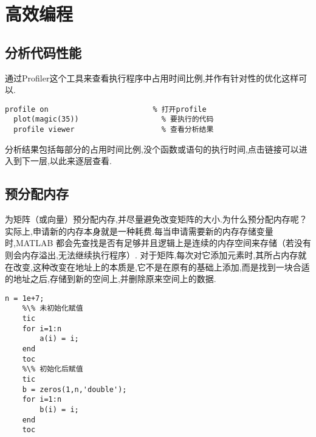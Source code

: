 \section{高效编程}



\subsection{分析代码性能}
 通过Profiler这个工具来查看执行程序中占用时间比例,并作有针对性的优化这样可以.

  \vspace{-0.8cm}
  \begin{lstlisting}[caption = 用Profiler分析代码性能] 
  profile on                        % 打开profile
  plot(magic(35))                   % 要执行的代码
  profile viewer                    % 查看分析结果
  \end{lstlisting}

分析结果包括每部分的占用时间比例,没个函数或语句的执行时间,点击链接可以进入到下一层,以此来逐层查看.





\subsection{预分配内存}
 为矩阵（或向量）预分配内存,并尽量避免改变矩阵的大小.为什么预分配内存呢？实际上,申请新的内存本身就是一种耗费.每当申请需要新的内存存储变量时,MATLAB 都会先查找是否有足够并且逻辑上是连续的内存空间来存储（若没有则会内存溢出,无法继续执行程序）. 对于矩阵,每次对它添加元素时,其所占内存就在改变,这种改变在地址上的本质是,它不是在原有的基础上添加,而是找到一块合适的地址之后,存储到新的空间上,并删除原来空间上的数据.

  \vspace{-0.8cm}
  \begin{lstlisting}[caption = 是否预分配内存效率对比]
    n = 1e+7;
    %\% 未初始化赋值
    tic
    for i=1:n
        a(i) = i;
    end
    toc
    %\% 初始化后赋值
    tic
    b = zeros(1,n,'double');
    for i=1:n
        b(i) = i;
    end
    toc
  \end{lstlisting}

